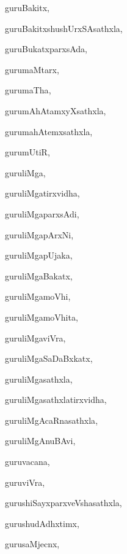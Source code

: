 \begin{multicols}{3}
{\noindent
{guruBakitx}, \pageref{guruBakitx}

\noindent
{guruBakitxshushUrxSAsathxla}, \pageref{guruBakitxshushUrxSAsathxla}

\noindent
{guruBukatxparxsAda}, \pageref{guruBukatxparxsAda}

\noindent
{gurumaMtarx}, \pageref{gurumaMtarx}

\noindent
{gurumaTha}, \pageref{gurumaTha}

\noindent
{gurumAhAtamxyXsathxla}, \pageref{gurumAhAtamxyXsathxla}

\noindent
{gurumahAtemxsathxla}, \pageref{gurumahAtemxsathxla}

\noindent
{gurumUtiR}, \pageref{gurumUtiR}

\noindent
{guruliMga}, \pageref{guruliMga}

\noindent
{guruliMgatirxvidha}, \pageref{guruliMgatirxvidha}

\noindent
{guruliMgaparxsAdi}, \pageref{guruliMgaparxsAdi}

\noindent
{guruliMgapArxNi}, \pageref{guruliMgapArxNi}

\noindent
{guruliMgapUjaka}, \pageref{guruliMgapUjaka}

\noindent
{guruliMgaBakatx}, \pageref{guruliMgaBakatx}

\noindent
{guruliMgamoVhi}, \pageref{guruliMgamoVhi}

\noindent
{guruliMgamoVhita}, \pageref{guruliMgamoVhita}

\noindent
{guruliMgaviVra}, \pageref{guruliMgaviVra}

\noindent
{guruliMgaSaDaBxkatx}, \pageref{guruliMgaSaDaBxkatx}

\noindent
{guruliMgasathxla}, \pageref{guruliMgasathxla}

\noindent
{guruliMgasathxlatirxvidha}, \pageref{guruliMgasathxlatirxvidha}

\noindent
{guruliMgAcaRnasathxla}, \pageref{guruliMgAcaRnasathxla}

\noindent
{guruliMgAnuBAvi}, \pageref{guruliMgAnuBAvi}

\noindent
{guruvacana}, \pageref{guruvacana}

\noindent
{guruviVra}, \pageref{guruviVra}

\noindent
{gurushiSayxparxveVshasathxla}, \pageref{gurushiSayxparxveVshasathxla}

\noindent
{gurushudAdhxtimx}, \pageref{gurushudAdhxtimx}

\noindent
{gurusaMjecnx}, \pageref{gurusaMjecnx}

}
\end{multicols}
